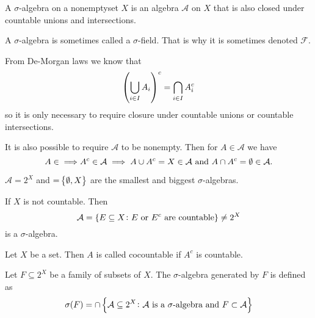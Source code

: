 \documentclass[11pt,a4paper]{article}
\begin{document}
\begin{definition}
  A $\sigma$-algebra on a nonemptyset $X$ is an algebra $\mathcal A$ on
  $X$ that is also closed under countable unions and intersections.
\end{definition}

\begin{remark}
  A $\sigma$-algebra is sometimes called a $\sigma$-field.
  That is why it is sometimes denoted $\mathcal F$.
\end{remark}

\begin{remark}
  From De-Morgan laws we know that
  \[
    \del{\bigcup_{i \in I} A_i}^c =
    \bigcap_{i \in I} A_i^c
  \]
  so it is only necessary to require closure under countable unions
  or countable intersections.
\end{remark}

\begin{remark}
  It is also possible to require $\mathcal A$ to be nonempty.
  Then for $A \in \mathcal A$ we have
  \[
    A \in \mathcal \implies A^c \in \mathcal A \implies
    A \cup A^c = X \in \mathcal A \text{ and }
    A \cap A^c = \emptyset \in \mathcal A.
  \]
\end{remark}

\begin{example}
  $\mathcal A = 2^X$ and $\mathcal = \set{\emptyset, X}$ are the smallest
  and biggest $\sigma$-algebras.
\end{example}

\begin{example}
  If $X$ is not countable.
  Then
  \[
    \mathcal A =
    \set{E \subseteq X \colon E \text{ or }E^c \text{ are countable}} \neq
    2^X
  \]
  is a $\sigma$-algebra.
\end{example}

\begin{definition}[Cocountablility]
  Let $X$ be a set. Then $A$ is called cocountable if $A^c$ is countable.
\end{definition}

\begin{example}
  Let $F \subseteq 2^X$ be a family of subsets of $X$.
  The $\sigma$-algebra generated by $F$ is defined as
  \[
    \sigma(F) = \cap \set{\mathcal A \subseteq 2^X \colon 
  \mathcal A \text{ is a $\sigma$-algebra} \text{ and }F \subset \mathcal A}
  \]
\end{example}

\end{document}
